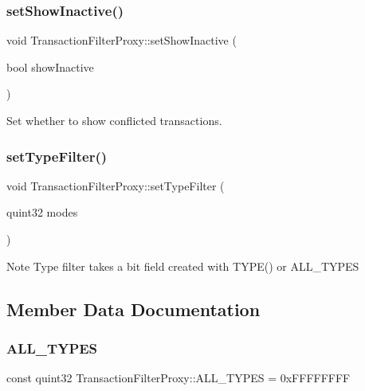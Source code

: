 \subsubsection{\texorpdfstring{setShowInactive()}{setShowInactive()}}
{\footnotesize\ttfamily void Transaction\+Filter\+Proxy\+::set\+Show\+Inactive (\begin{DoxyParamCaption}\item[{bool}]{show\+Inactive }\end{DoxyParamCaption})}

Set whether to show conflicted transactions. \mbox{\label{class_transaction_filter_proxy_af28eee58aee7585b71f057d044408106}} 
\subsubsection{\texorpdfstring{setTypeFilter()}{setTypeFilter()}}
{\footnotesize\ttfamily void Transaction\+Filter\+Proxy\+::set\+Type\+Filter (\begin{DoxyParamCaption}\item[{quint32}]{modes }\end{DoxyParamCaption})}

\begin{DoxyNote}{Note}
Type filter takes a bit field created with T\+Y\+P\+E() or A\+L\+L\+\_\+\+T\+Y\+P\+ES 
\end{DoxyNote}


\subsection{Member Data Documentation}
\mbox{\label{class_transaction_filter_proxy_a845c1358f6cc8e60b6fae4725d2fc03f}} 
\subsubsection{\texorpdfstring{ALL\_TYPES}{ALL\_TYPES}}
{\footnotesize\ttfamily const quint32 Transaction\+Filter\+Proxy\+::\+A\+L\+L\+\_\+\+T\+Y\+P\+ES = 0x\+F\+F\+F\+F\+F\+F\+FF\hspace{0.3cm}{\ttfamily [static]}}

